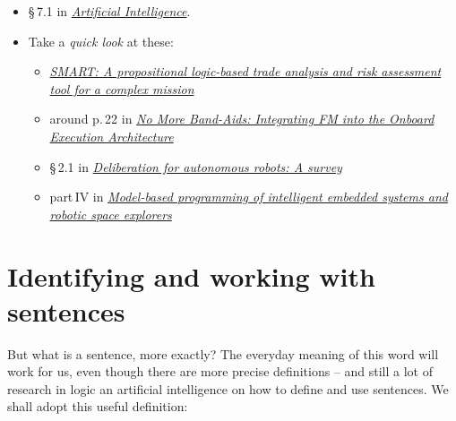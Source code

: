 \documentclass[
  a4paper,
  DIV=11,
  numbers=noendperiod,
  oneside]{scrreprt}
\providecommand{\tightlist}{%
  \setlength{\itemsep}{0pt}\setlength{\parskip}{0pt}}\usepackage{longtable,booktabs,array}
\begin{document}
\begin{tcolorbox}[enhanced jigsaw, colback=white, breakable, coltitle=black, bottomtitle=1mm, title={\faIcon{book} Reading}, leftrule=.75mm, opacitybacktitle=0.6, opacityback=0, colframe=quarto-callout-caution-color-frame, colbacktitle=quarto-callout-caution-color!10!white, rightrule=.15mm, arc=.35mm, titlerule=0mm, toprule=.15mm, left=2mm, toptitle=1mm, bottomrule=.15mm]

\begin{itemize}
\tightlist
\item
  §\,7.1 in
  \href{https://hvl.instructure.com/courses/25074/modules/items/660089}{\emph{Artificial
  Intelligence}}.
\item
  Take a \emph{quick look} at these:

  \begin{itemize}
  \tightlist
  \item
    \href{https://hdl.handle.net/2014/45618}{\emph{SMART: A
    propositional logic-based trade analysis and risk assessment tool
    for a complex mission}}
  \item
    around p.\,22 in
    \href{https://www.nasa.gov/sites/default/files/637606main_day_1-michel_ingham.pdf}{\emph{No
    More Band-Aids: Integrating FM into the Onboard Execution
    Architecture}}
  \item
    §\,2.1 in
    \href{http://doi.org/10.1016/j.artint.2014.11.003}{\emph{Deliberation
    for autonomous robots: A survey}}
  \item
    part\,IV in
    \href{https://hvl.instructure.com/courses/25074/modules/items/668587}{\emph{Model-based
    programming of intelligent embedded systems and robotic space
    explorers}}
  \end{itemize}
\end{itemize}

\end{tcolorbox}

\hypertarget{identifying-and-working-with-sentences}{%
\section{Identifying and working with
sentences}\label{identifying-and-working-with-sentences}}

But what is a sentence, more exactly? The everyday meaning of this word
will work for us, even though there are more precise definitions -- and
still a lot of research in logic an artificial intelligence on how to
define and use sentences. We shall adopt this useful definition:
\end{document}
